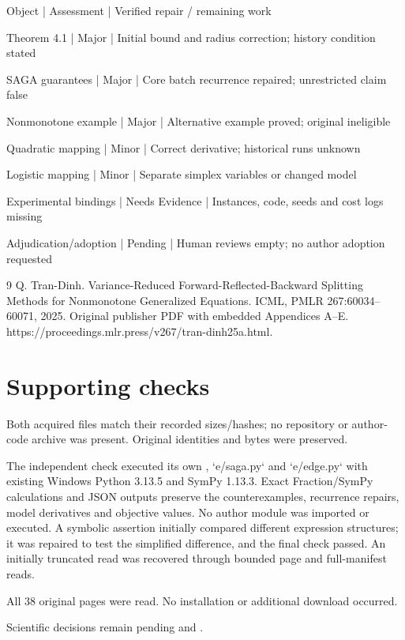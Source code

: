 \documentclass[10pt]{article}
\begin{document}
Object | Assessment | Verified repair / remaining work\par
Theorem 4.1 | Major | Initial bound and radius correction; history condition stated\par
SAGA guarantees | Major | Core batch recurrence repaired; unrestricted claim false\par
Nonmonotone example | Major | Alternative example proved; original ineligible\par
Quadratic mapping | Minor | Correct derivative; historical runs unknown\par
Logistic mapping | Minor | Separate simplex variables or changed model\par
Experimental bindings | Needs Evidence | Instances, code, seeds and cost logs missing\par
Adjudication/adoption | Pending | Human reviews empty; no author adoption requested\par
9 Q. Tran-Dinh. Variance-Reduced Forward-Reflected-Backward Splitting Methods for Nonmonotone Generalized Equations. ICML, PMLR 267:60034–60071, 2025. Original publisher PDF with embedded Appendices A–E. https://proceedings.mlr.press/v267/tran-dinh25a.html.\par
\section*{Supporting checks}
Both acquired files match their recorded sizes/hashes; no repository or author-code archive was present. Original identities and bytes were preserved.\par
The independent check executed its own , `e/saga.py` and `e/edge.py` with existing Windows Python 3.13.5 and SymPy 1.13.3. Exact Fraction/SymPy calculations and JSON outputs preserve the counterexamples, recurrence repairs, model derivatives and objective values. No author module was imported or executed. A symbolic assertion initially compared different expression structures; it was repaired to test the simplified difference, and the final check passed. An initially truncated read was recovered through bounded page and full-manifest reads.\par
All 38 original pages were read. No installation or additional download occurred.\par
Scientific decisions remain pending and .\par
\end{document}
